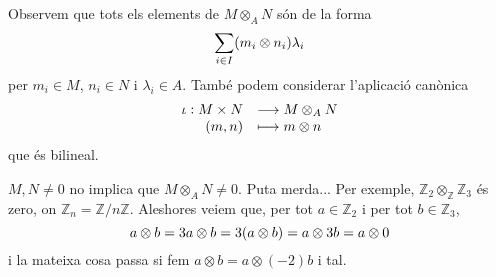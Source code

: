\documentclass[../../../main.tex]{subfiles}
\begin{document}
\begin{nota}
Observem que tots els elements de $M\otimes_AN$ són de la forma
\begin{equation}
    \notag
    \sum_{i\in I}(m_i\otimes n_i)\lambda_i
\end{equation}
per $m_i\in M$, $n_i\in N$ i $\lambda_i\in A$. També podem considerar l'aplicació canònica
\begin{equation}
    \notag
    \begin{array}{rl}
        \iota:M\times N & \longrightarrow M\otimes_AN \\
        (m,n) & \longmapsto m\otimes n
    \end{array}
\end{equation}
que és bilineal.
\end{nota}



\begin{nota}
$M,N\not=0$ no implica que $M\otimes_AN\not=0$. Puta merda... Per exemple, $\mathbb{Z}_2\otimes_\mathbb{Z}\mathbb{Z}_3$ és zero, on $\mathbb{Z}_n = \mathbb{Z}/n\mathbb{Z}$. Aleshores veiem que, per tot $a\in\mathbb{Z}_2$ i per tot $b\in\mathbb{Z}_3$,
\begin{equation}
    \notag
    a\otimes b = 3a\otimes b = 3(a\otimes b)=a\otimes 3b = a\otimes 0
\end{equation}
i la mateixa cosa passa si fem $a\otimes b = a\otimes (-2)b$ i tal. 
\end{nota}
\end{document}
